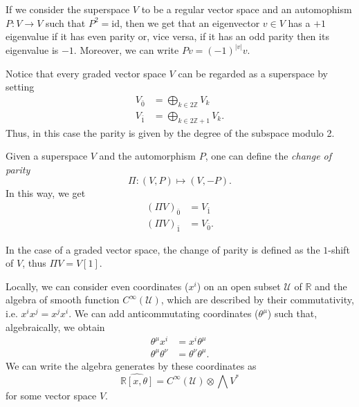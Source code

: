If we consider the superspace $V$ to be a regular vector space and an automophism $P: V \rightarrow V$ such that $P^2 = \text{id}$, then we get that an eigenvector $v \in V$ has a $+1$ eigenvalue if it has even parity or, vice versa, if it has an odd parity then its eigenvalue is $-1$.
Moreover, we can write $P v = (-1)^{|v|}v$.

Notice that every graded vector space $V$ can be regarded as a superspace by setting
\begin{align*}
    V_{\bar{0}} &= \bigoplus_{k \in 2 \mathbb{Z}} V_k \\
    V_{\bar{1}} &= \bigoplus_{k \in 2 \mathbb{Z} + 1} V_k .
\end{align*}
Thus, in this case the parity is given by the degree of the subspace modulo 2.

Given a superspace $V$ and the automorphism $P$, one can define the \emph{change of parity}
\begin{equation*}
    \Pi : (V, P) \mapsto (V, -P) .
\end{equation*}
In this way, we get
\begin{align*}
    (\Pi V)_{\bar{0}} &= V_{\bar{1}} \\
    (\Pi V)_{\bar{1}} &= V_{\bar{0}} .
\end{align*}

In the case of a graded vector space, the change of parity is defined as the $1$-shift of $V$, thus $\Pi V= V[1]$.

\begin{example}
\label{ex:comm_anticomm}
    Locally, we can consider even coordinates ($x^i$) on an open subset $\mathcal{U}$ of $\mathbb{R}$ and the algebra of smooth function $C^\infty (\mathcal{U})$, which are described by their commutativity, i.e. $x^i x^j = x^j x^i$.
    We can add anticommutating coordinates ($\theta^\mu$) such that, algebraically, we obtain
    \begin{align*}
        \theta^\mu x^i &= x^i \theta^\mu \\
        \theta^\mu \theta^\nu &= \theta^\nu \theta^\mu.
    \end{align*}
    We can write the algebra generates by these coordinates as
    \begin{equation*}
        \widehat{\mathbb{R}[x, \theta]} = C^\infty (\mathcal{U}) \otimes \bigwedge V^*
    \end{equation*}
    for some vector space $V$.
\end{example}
